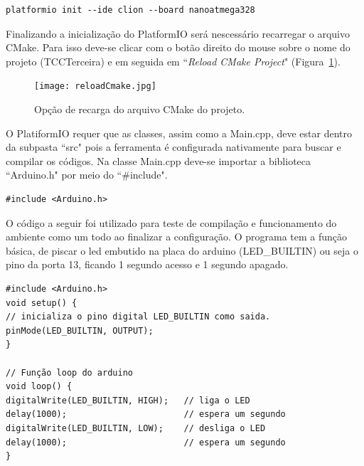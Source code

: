 \documentclass[a4paper,12pt,portuguese]{ufms-cpcx}
\begin{document}
\begin{lstlisting}
platformio init --ide clion --board nanoatmega328
\end{lstlisting}
Finalizando a inicialização do PlatformIO será nescessário recarregar o arquivo CMake. Para isso deve-se clicar com o botão direito do mouse sobre o nome do projeto (TCCTerceira) e em seguida em ``\textit{Reload CMake Project}" (Figura~\ref{fig:reloadcmake}).
\begin{figure}[H]	
	\centering
	\texttt{[image: reloadCmake.jpg]}
	\caption{Opção de recarga do arquivo CMake do projeto.}
	\label{fig:reloadcmake}
\end{figure}
O PlatiformIO requer que as classes, assim como a Main.cpp, deve estar dentro da subpasta ``src" pois a ferramenta é configurada nativamente para buscar e compilar os códigos. Na classe Main.cpp deve-se importar a biblioteca ``Arduino.h" por meio do ``\#include".
\begin{lstlisting}
#include <Arduino.h>
\end{lstlisting}
O código a seguir foi utilizado para teste de compilação e funcionamento do ambiente como um todo ao finalizar a configuração. O programa tem a função básica, de piscar o led embutido na placa do arduino (LED\_BUILTIN) ou seja o pino da porta 13, ficando 1 segundo acesso e 1 segundo apagado.

\begin{lstlisting}
#include <Arduino.h>
void setup() {
// inicializa o pino digital LED_BUILTIN como saida.
pinMode(LED_BUILTIN, OUTPUT);
}

// Função loop do arduino
void loop() {
digitalWrite(LED_BUILTIN, HIGH);   // liga o LED 
delay(1000);                       // espera um segundo
digitalWrite(LED_BUILTIN, LOW);    // desliga o LED
delay(1000);                       // espera um segundo
}
\end{lstlisting}
\end{document}
